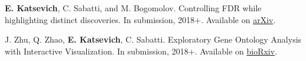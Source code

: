\documentclass[letterpaper]{article}
\begin{document}
\begin{thebibliography}{10}
{\bf E. Katsevich}, C. Sabatti, and M. Bogomolov. 
\newblock Controlling FDR while highlighting distinct discoveries.
\newblock In submission, 2018+. Available on \href{https://arxiv.org/abs/1809.01792}{arXiv}.

J. Zhu, Q. Zhao, {\bf E. Katsevich}, C. Sabatti.
\newblock Exploratory Gene Ontology Analysis with Interactive Visualization.
\newblock In submission, 2018+. Available on \href{https://www.biorxiv.org/content/early/2018/10/05/436741}{bioRxiv}.

















\end{thebibliography}

%
%
%
%

%
%
%
%
\end{document}
